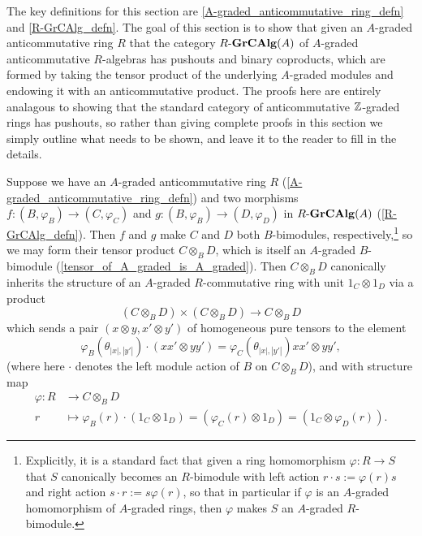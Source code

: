 \documentclass[../main.tex]{subfiles}
\begin{document}
The key definitions for this section are \autoref{A-graded_anticommutative_ring_defn} and \autoref{R-GrCAlg_defn}. The goal of this section is to show that given an $A$-graded anticommutative ring $R$ that the category $R\text-\mathbf{GrCAlg}(A)$ of $A$-graded anticommutative $R$-algebras has pushouts and binary coproducts, which are formed by taking the tensor product of the underlying $A$-graded modules and endowing it with an anticommutative product. The proofs here are entirely analagous to showing that the standard category of anticommutative $\mathbb{Z}$-graded rings has pushouts, so rather than giving complete proofs in this section we simply outline what needs to be shown, and leave it to the reader to fill in the details.

\begin{proposition}\label{B-tensor_product_in_R-GrCAlg}
	Suppose we have an $A$-graded anticommutative ring $R$ (\autoref{A-graded_anticommutative_ring_defn}) and two morphisms $f:(B,\varphi_B)\to(C,\varphi_C)$ and $g:(B,\varphi_B)\to(D,\varphi_D)$ in $R\text-\mathbf{GrCAlg}(A)$ (\autoref{R-GrCAlg_defn}). Then $f$ and $g$ make $C$ and $D$ both $B$-bimodules, respectively,\footnote{Explicitly, it is a standard fact that given a ring homomorphism $\varphi:R\to S$ that $S$ canonically becomes an $R$-bimodule with left action $r\cdot s:=\varphi(r)s$ and right action $s\cdot r:=s\varphi(r)$, so that in particular if $\varphi$ is an $A$-graded homomorphism of $A$-graded rings, then $\varphi$ makes $S$ an $A$-graded $R$-bimodule.} so we may form their tensor product $C\otimes_BD$, which is itself an $A$-graded $B$-bimodule (\autoref{tensor_of_A_graded_is_A_graded}). Then $C\otimes_BD$ canonically inherits the structure of an $A$-graded $R$-commutative ring with unit $1_C\otimes 1_D$ via a product
	\[(C\otimes_BD)\times(C\otimes_BD)\to C\otimes_BD\]
	which sends a pair $(x\otimes y,x'\otimes y')$ of homogeneous pure tensors to the element
	\[\varphi_B(\theta_{|x|,|y'|})\cdot(xx'\otimes yy')=\varphi_C(\theta_{|x|,|y'|})xx'\otimes yy',\]
	(where here $\cdot$ denotes the left module action of $B$ on $C\otimes_BD$), and with structure map
	\begin{align*}
		\varphi:R&\to C\otimes_BD \\ 
		r&\mapsto \varphi_B(r)\cdot(1_C\otimes 1_D)=(\varphi_C(r)\otimes 1_D)=(1_C\otimes\varphi_D(r)).
	\end{align*}
\end{proposition}
\end{document}
